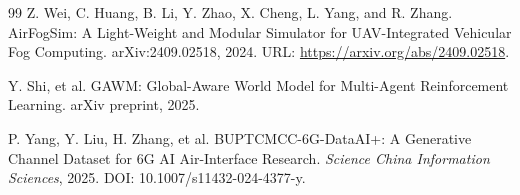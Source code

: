 ﻿\documentclass[UTF8,a4paper,11pt]{ctexart}
\begin{document}
\begin{thebibliography}{99}
Z. Wei, C. Huang, B. Li, Y. Zhao, X. Cheng, L. Yang, and R. Zhang. AirFogSim: A Light-Weight and Modular Simulator for UAV-Integrated Vehicular Fog Computing. arXiv:2409.02518, 2024. URL: \url{https://arxiv.org/abs/2409.02518}.

Y. Shi, et al. GAWM: Global-Aware World Model for Multi-Agent Reinforcement Learning. arXiv preprint, 2025.

P. Yang, Y. Liu, H. Zhang, et al. BUPTCMCC-6G-DataAI+: A Generative Channel Dataset for 6G AI Air-Interface Research. \textit{Science China Information Sciences}, 2025. DOI: 10.1007/s11432-024-4377-y.

\end{thebibliography}
\end{document}

